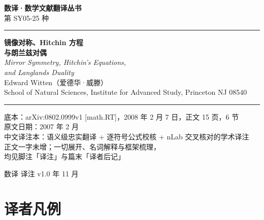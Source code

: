 
\begin{titlepage}
\centering
\vspace*{1.2cm}

{\large\bfseries 数译\;·\;数学文献翻译丛书}\\[0.35em]
{\small 第 SY05-25 种}\\[0.6em]
{\color{black!55}\rule{0.62\linewidth}{0.4pt}}

\vspace{2.1cm}

{\Huge\bfseries\linespread{1.15}\selectfont 镜像对称、Hitchin 方程\\[0.5em] 与朗兰兹对偶}\\[1.1em]
{\large\itshape Mirror Symmetry, Hitchin's Equations,\\[0.2em] and Langlands Duality}\\[1.4em]
{\large Edward Witten（爱德华·威滕）}\\[0.4em]
{\small School of Natural Sciences, Institute for Advanced Study, Princeton NJ 08540}

\vspace{1.2cm}
{\color{black!55}\rule{0.62\linewidth}{0.4pt}}

\vfill

\begin{minipage}{0.92\linewidth}
\small\centering
底本：arXiv:0802.0999v1 [math.RT]，2008 年 2 月 7 日，正文 15 页，6 节\\
原文日期：2007 年 2 月\\[0.9em]
中文译注本：语义级忠实翻译 \;+\; 逐符号公式校核 \;+\; nLab 交叉核对的学术译注\\
正文一字未增；一切展开、名词解释与框架梳理，\\[0.2em]
均见脚注「译注」与篇末「译者后记」
\end{minipage}

\vspace{1.4cm}
{\small 数译 \; 译注 \; v1.0  年 11 月}
\vspace*{0.6cm}
\end{titlepage}

\section*{译者凡例}

